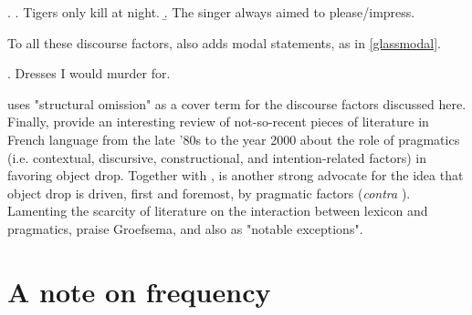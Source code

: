 \ex. \label{goldadd} \a. \label{goldadd3} Tigers only kill at night.
\b. \label{goldadd4} The singer always aimed to please/impress.

To all these discourse factors, \textcite[3]{Glass2020} also adds modal statements, as in \ref{glassmodal}.

\ex. \label{glassmodal} Dresses I would murder for.

\textcite[66]{Lorenzetti2008} uses "structural omission" as a cover term for the discourse factors discussed here. Finally, \textcite[46]{CumminsRoberge2005} provide an interesting review of not-so-recent pieces of literature in French language from the late '80s to the year 2000 about the role of pragmatics (i.e. contextual, discursive, constructional, and intention-related factors) in favoring object drop. Together with \textcite{Goldberg2001, Goldberg2005, Goldberg2005a, goldberg2006constructions}, \textcite{groefsema1995understood} is another strong advocate for the idea that object drop is driven, first and foremost, by pragmatic factors (\textit{contra} \textcite[29]{PethoKardos2006}). Lamenting the scarcity of literature on the interaction between lexicon and pragmatics, \textcite[7]{Garcia-VelascoMunoz2002} praise Groefsema, and also \textcite{Allerton1975, Fillmore1986, FellbaumKegl1989taxonomic} as "notable exceptions".


\section{A note on frequency} 

